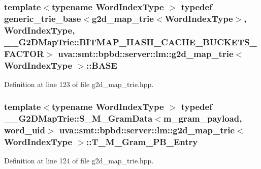 \subsubsection[{B\+A\+S\+E}]{\setlength{\rightskip}{0pt plus 5cm}template$<$typename Word\+Index\+Type $>$ typedef {\bf generic\+\_\+trie\+\_\+base}$<${\bf g2d\+\_\+map\+\_\+trie}$<${\bf Word\+Index\+Type}$>$, {\bf Word\+Index\+Type}, \+\_\+\+\_\+\+G2\+D\+Map\+Trie\+::\+B\+I\+T\+M\+A\+P\+\_\+\+H\+A\+S\+H\+\_\+\+C\+A\+C\+H\+E\+\_\+\+B\+U\+C\+K\+E\+T\+S\+\_\+\+F\+A\+C\+T\+O\+R$>$ {\bf uva\+::smt\+::bpbd\+::server\+::lm\+::g2d\+\_\+map\+\_\+trie}$<$ {\bf Word\+Index\+Type} $>$\+::{\bf B\+A\+S\+E}}\label{classuva_1_1smt_1_1bpbd_1_1server_1_1lm_1_1g2d__map__trie_a2b15dbbb98391a04427bc3d651816654}


Definition at line 123 of file g2d\+\_\+map\+\_\+trie.\+hpp.

\hypertarget{classuva_1_1smt_1_1bpbd_1_1server_1_1lm_1_1g2d__map__trie_a03f7ddb6d421914955f727c1d5d74cc2}{}
\subsubsection[{T\+\_\+\+M\+\_\+\+Gram\+\_\+\+P\+B\+\_\+\+Entry}]{\setlength{\rightskip}{0pt plus 5cm}template$<$typename Word\+Index\+Type $>$ typedef {\bf \+\_\+\+\_\+\+G2\+D\+Map\+Trie\+::\+S\+\_\+\+M\+\_\+\+Gram\+Data}$<${\bf m\+\_\+gram\+\_\+payload}, {\bf word\+\_\+uid}$>$ {\bf uva\+::smt\+::bpbd\+::server\+::lm\+::g2d\+\_\+map\+\_\+trie}$<$ {\bf Word\+Index\+Type} $>$\+::{\bf T\+\_\+\+M\+\_\+\+Gram\+\_\+\+P\+B\+\_\+\+Entry}}\label{classuva_1_1smt_1_1bpbd_1_1server_1_1lm_1_1g2d__map__trie_a03f7ddb6d421914955f727c1d5d74cc2}


Definition at line 124 of file g2d\+\_\+map\+\_\+trie.\+hpp.

\hypertarget{classuva_1_1smt_1_1bpbd_1_1server_1_1lm_1_1g2d__map__trie_aec7f86efc233c482645f988dcf3bb115}{}
